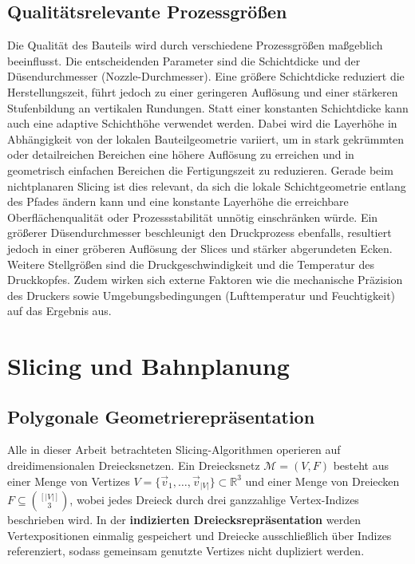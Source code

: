         \subsection{Qualitätsrelevante Prozessgrößen}\label{subsec:quality-relevant-process-variables}
        Die Qualität des Bauteils wird durch verschiedene Prozessgrößen maßgeblich beeinflusst.
        Die entscheidenden Parameter sind die Schichtdicke und der Düsendurchmesser (Nozzle-Durchmesser).
        Eine größere Schichtdicke reduziert die Herstellungszeit, führt jedoch zu einer geringeren Auflösung und einer stärkeren Stufenbildung an vertikalen Rundungen.
        Statt einer konstanten Schichtdicke kann auch eine adaptive Schichthöhe verwendet werden.
        Dabei wird die Layerhöhe in Abhängigkeit von der lokalen Bauteilgeometrie variiert,
        um in stark gekrümmten oder detailreichen Bereichen eine höhere Auflösung zu erreichen
        und in geometrisch einfachen Bereichen die Fertigungszeit zu reduzieren.
        Gerade beim nichtplanaren Slicing ist dies relevant,
        da sich die lokale Schichtgeometrie entlang des Pfades ändern kann und eine konstante Layerhöhe
        die erreichbare Oberflächenqualität oder Prozessstabilität unnötig einschränken würde.
        Ein größerer Düsendurchmesser beschleunigt den Druckprozess ebenfalls, resultiert jedoch in einer gröberen Auflösung der Slices und stärker abgerundeten Ecken.
        Weitere Stellgrößen sind die Druckgeschwindigkeit und die Temperatur des Druckkopfes.
        Zudem wirken sich externe Faktoren wie die mechanische Präzision des Druckers sowie Umgebungsbedingungen (Lufttemperatur und Feuchtigkeit) auf das Ergebnis aus.
        \cite{gibsonAdditiveManufacturingTechnologies2010}
        \cite{ahmadSystematicReviewFused2022}

    \section{Slicing und Bahnplanung}\label{sec:slicing-and-path-planning}
        \subsection{Polygonale Geometrierepräsentation}\label{subsec:polygonal-geometry-representation}
        Alle in dieser Arbeit betrachteten Slicing-Algorithmen operieren auf dreidimensionalen Dreiecksnetzen.
        Ein Dreiecksnetz $\mathcal{M} = (V, F)$ besteht aus einer Menge von Vertizes
        $V = \{\vec{v}_1, \dots, \vec{v}_{|V|}\} \subset \mathbb{R}^3$
        und einer Menge von Dreiecken $F \subseteq \binom{[|V|]}{3}$,
        wobei jedes Dreieck durch drei ganzzahlige Vertex-Indizes beschrieben wird.
        In der \textbf{indizierten Dreiecksrepräsentation} werden Vertexpositionen einmalig gespeichert
        und Dreiecke ausschließlich über Indizes referenziert,
        sodass gemeinsam genutzte Vertizes nicht dupliziert werden.

